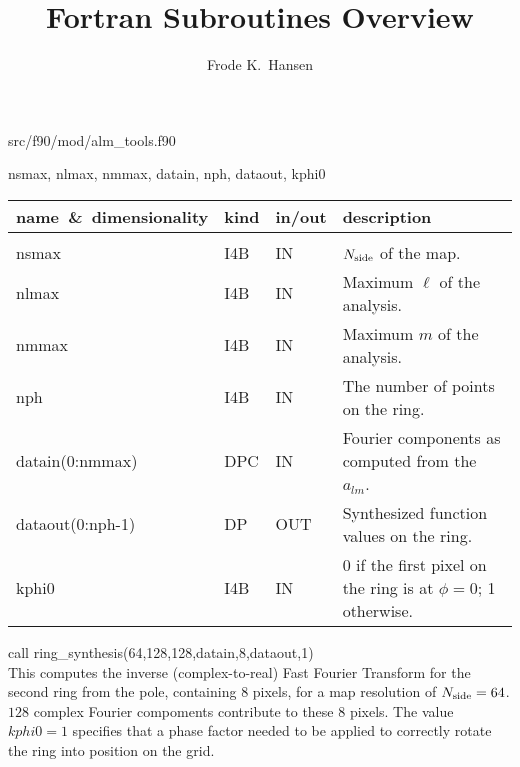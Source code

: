 
\sloppy


\title{\healpix Fortran Subroutines Overview}
 \section[ring\_synthesis]{ }
\label{sub:ring_synthesis}
\author{Frode K.~Hansen}

\begin{facility}
{}
{src/f90/mod/alm\_tools.f90}
\end{facility}

\begin{f90format}
{nsmax, nlmax, nmmax, datain, nph, dataout, kphi0}
\end{f90format}

\begin{arguments}
{
\begin{tabular}{p{0.4\hsize} p{0.05\hsize} p{0.1\hsize} p{0.35\hsize}} \hline  
\textbf{name~\&~dimensionality} & \textbf{kind} & \textbf{in/out} & \textbf{description} \\ \hline
                   &   &   &                           \\ %
nsmax & I4B & IN & ${N_{\rm side}}$ of the map.  \\
nlmax & I4B & IN & Maximum $\ell$ of the analysis. \\
nmmax & I4B & IN & Maximum $m$ of the analysis. \\
nph & I4B & IN & The number of points on the ring. \\ 
datain(0:nmmax) & DPC & IN & Fourier components as computed from the $a_{lm}$. \\
dataout(0:nph-1) & DP & OUT & Synthesized function values on the ring. \\
kphi0 & I4B & IN &  0 if the first pixel on the ring is  at
                   $\phi=0$; 1 otherwise. \\
\end{tabular}
}
\end{arguments}

\begin{example}
{
call ring\_synthesis(64,128,128,datain,8,dataout,1)   \\
}
{
This computes the inverse (complex-to-real) Fast Fourier Transform for
the second ring from the pole, containing $8$ pixels, for a map
resolution of ${N_{\rm side}}=64$. $128$ complex Fourier
compoments contribute to these 8 pixels. The value $kphi0=1$ specifies
that a phase factor needed to be applied to correctly
rotate the ring into position on the \healpix grid.
}
\end{example}

